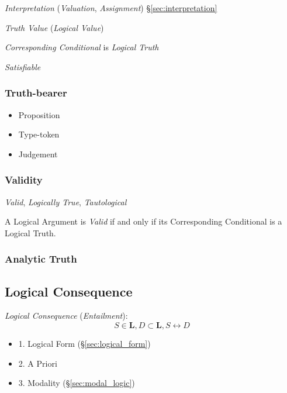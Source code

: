 \emph{Interpretation} (\emph{Valuation}, \emph{Assignment})
\S\ref{sec:interpretation}

\emph{Truth Value} (\emph{Logical Value})

\emph{Corresponding Conditional} is \emph{Logical Truth}

\emph{Satisfiable}



\subsubsection{Truth-bearer}\label{sec:truth_bearer}

\begin{itemize}
\item Proposition
\item Type-token
\item Judgement
\end{itemize}



\subsubsection{Validity}\label{sec:validity}

\emph{Valid}, \emph{Logically True}, \emph{Tautological}

A Logical Argument is \emph{Valid} if and only if its
Corresponding Conditional is a Logical Truth.



\subsubsection{Analytic Truth}\label{sec:analytic_truth}



\subsection{Logical Consequence}\label{sec:logical_consequence}
\cite{beall-restall05}

\emph{Logical Consequence} (\emph{Entailment}):
\[
    S \in \mathbf{L}, D \subset \mathbf{L}, S \leftrightarrow D
\]
\begin{itemize}
    \item 1. Logical Form (\S\ref{sec:logical_form})
    \item 2. A Priori
    \item 3. Modality (\S\ref{sec:modal_logic})
\end{itemize}


